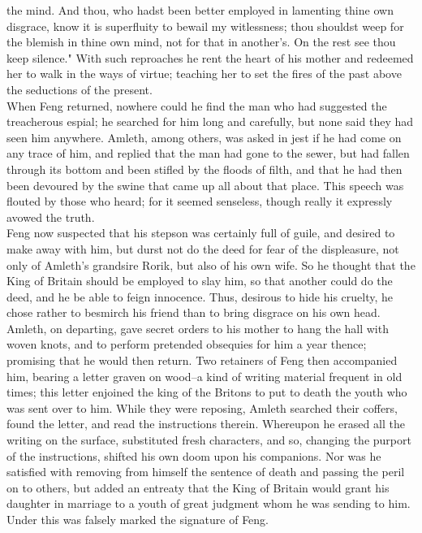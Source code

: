 \documentclass[10pt,a4paper]{report}
\begin{document}
the mind. And thou, who hadst been better employed in lamenting thine own disgrace, know it is superfluity to bewail my witlessness; thou shouldst weep for the blemish in thine own mind, not for that in another's. On the rest see thou keep silence." With such reproaches he rent the heart of his mother and redeemed her to walk in the ways of virtue; teaching her to set the fires of the past above the seductions of the present.\\

When Feng returned, nowhere could he find the man who had suggested the treacherous espial; he searched for him long and carefully, but none said they had seen him anywhere. Amleth, among others, was asked in jest if he had come on any trace of him, and replied that the man had gone to the sewer, but had fallen through its bottom and been stifled by the floods of filth, and that he had then been devoured by the swine that came up all about that place. This speech was flouted by those who heard; for it seemed senseless, though really it expressly avowed the truth.\\

Feng now suspected that his stepson was certainly full of guile, and desired to make away with him, but durst not do the deed for fear of the displeasure, not only of Amleth's grandsire Rorik, but also of his own wife. So he thought that the King of Britain should be employed to slay him, so that another could do the deed, and he be able to feign innocence. Thus, desirous to hide his cruelty, he chose rather to besmirch his friend than to bring disgrace on his own head. Amleth, on departing, gave secret orders to his mother to hang the hall with woven knots, and to perform pretended obsequies for him a year thence; promising that he would then return. Two retainers of Feng then accompanied him, bearing a letter graven on wood--a kind of writing material frequent in old times; this letter enjoined the king of the Britons to put to death the youth who was sent over to him. While they were reposing, Amleth searched their coffers, found the letter, and read the instructions therein. Whereupon he erased all the writing on the surface, substituted fresh characters, and so, changing the purport of the instructions, shifted his own doom upon his companions. Nor was he satisfied with removing from himself the sentence of death and passing the peril on to others, but added an entreaty that the King of Britain would grant his daughter in marriage to a youth of great judgment whom he was sending to him. Under this was falsely marked the signature of Feng.\\
\end{document}
